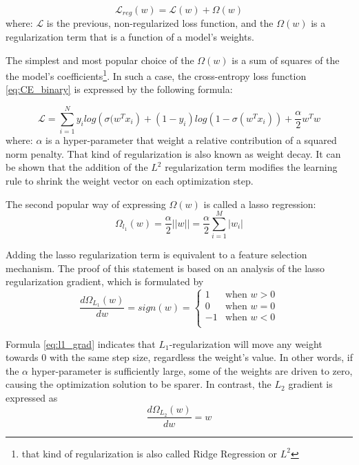 \begin{equation}
    \mathcal{L}_{reg}(w) = \mathcal{L}(w) + \Omega(w) 
\end{equation}
where: $\mathcal{L}$ is the previous, non-regularized loss function, and the $\Omega(w)$ is a regularization term that is a function of a model's weights. 

The simplest and most popular choice of the $\Omega(w)$ is a sum of squares of the the model's coefficients\footnote{that kind of regularization is also called Ridge Regression or $L^2$}. In such a case, the cross-entropy loss function \ref{eq:CE_binary} is expressed by the following formula:

\begin{equation}
    \mathcal{L} =  \sum_{i=1}^{N}y_{i}log\left( \sigma(w^{T}x_{i}\right)+(1-y_i)log(1-\sigma(w^{T}x_{i})) + \frac{\alpha}{2} w^{T}w
\end{equation}
where: $\alpha$ is a hyper-parameter that weight a relative contribution of a squared norm penalty. 
That kind of regularization is also known as weight decay. It can be shown  that the addition of the $L^2$  regularization term modifies the learning rule to shrink the weight vector on each optimization step. 

The second popular way of expressing $\Omega(w)$ is called a lasso regression:
\begin{equation}
\label{eq:lasso}
    \Omega_{l_1}(w) = \frac{\alpha}{2} ||w|| = \frac{\alpha}{2} \sum_{i=1}^{M} |w_i|
\end{equation}

 Adding the lasso regularization term is equivalent to a feature selection mechanism. The proof of this statement is based on an analysis of the lasso regularization gradient, which is formulated by 
\begin{equation}
\label{eq:l1_grad}
    \frac{d \Omega_{L_1}(w)}{dw} = sign(w) = \left\{ \begin{array}{ll}
1 & \textrm{when } w > 0\\
0 & \textrm{when } w = 0 \\
-1 & \textrm{when } w < 0 \\
\end{array} \right.
\end{equation}

Formula \ref{eq:l1_grad} indicates that $L_1$-regularization will move any weight towards 0 with the same step size, regardless the weight's value. In other words, if the $\alpha$ hyper-parameter is sufficiently large, some of the weights are driven to zero, causing the optimization solution to be sparer. In contrast, the $L_2$ gradient is expressed as 
\begin{equation}
     \frac{d \Omega_{L_2}(w)}{dw} = w
     \label{eq:l2_grad}
\end{equation}

